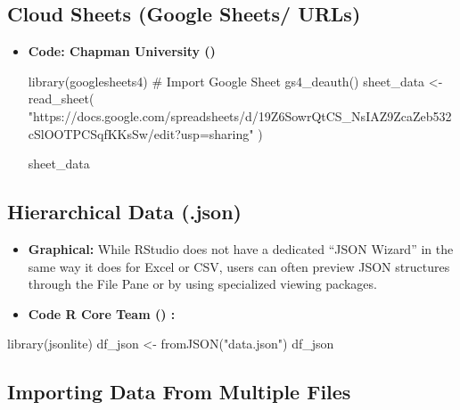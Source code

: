 \documentclass[
  doc,
  longtable,
  a4paper,
  nolmodern,
  notxfonts,
  notimes,
  colorlinks=true,linkcolor=blue,citecolor=blue,urlcolor=blue]{apa7}
\newenvironment{Shaded}{\begin{snugshade}}{\end{snugshade}}
\newcommand{\CommentTok}[1]{\textcolor[rgb]{0.37,0.37,0.37}{#1}}
\newcommand{\FunctionTok}[1]{\textcolor[rgb]{0.28,0.35,0.67}{#1}}
\newcommand{\NormalTok}[1]{\textcolor[rgb]{0.00,0.23,0.31}{#1}}
\newcommand{\OtherTok}[1]{\textcolor[rgb]{0.00,0.23,0.31}{#1}}
\newcommand{\StringTok}[1]{\textcolor[rgb]{0.13,0.47,0.30}{#1}}
\begin{document}
\subsection{Cloud Sheets (Google Sheets/
URLs)}\label{cloud-sheets-google-sheets-urls}

\begin{itemize}
\item
  \textbf{Code: Chapman University
  ()}

\begin{Shaded}
\begin{Highlighting}[]
\FunctionTok{library}\NormalTok{(googlesheets4)}
\CommentTok{\# Import Google Sheet}
\FunctionTok{gs4\_deauth}\NormalTok{()}
\NormalTok{sheet\_data }\OtherTok{\textless{}{-}} \FunctionTok{read\_sheet}\NormalTok{(}
  \StringTok{"https://docs.google.com/spreadsheets/d/19Z6SowrQtCS\_NsIAZ9ZcaZeb532cSlOOTPCSqfKKsSw/edit?usp=sharing"}
\NormalTok{)}

\NormalTok{sheet\_data}
\end{Highlighting}
\end{Shaded}
\end{itemize}

\subsection{Hierarchical Data (.json)}\label{hierarchical-data-.json}

\begin{itemize}
\item
  \textbf{Graphical:} While RStudio does not have a dedicated ``JSON
  Wizard'' in the same way it does for Excel or CSV, users can often
  preview JSON structures through the File Pane or by using specialized
  viewing packages.
\item
  \textbf{Code R Core Team () :}
\end{itemize}

\begin{Shaded}
\begin{Highlighting}[]
\FunctionTok{library}\NormalTok{(jsonlite)}
\NormalTok{df\_json }\OtherTok{\textless{}{-}} \FunctionTok{fromJSON}\NormalTok{(}\StringTok{"data.json"}\NormalTok{)}
\NormalTok{df\_json}
\end{Highlighting}
\end{Shaded}

\subsection{Importing Data From Multiple
Files}\label{importing-data-from-multiple-files}
\end{document}
